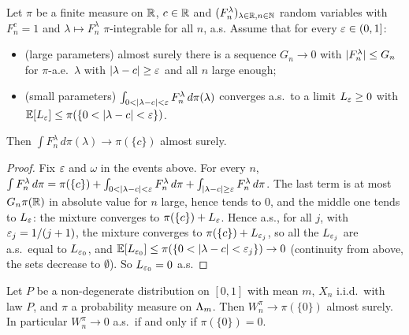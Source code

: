 \begin{lemma}
  \label{lem:nocash_abstract}
  \leanok
  Let $\pi$ be a finite measure on $\mathbb{R}$, $c \in \mathbb{R}$ and $(F^\lambda_n)_{\lambda \in \mathbb{R}, n \in \mathbb{N}}$
  random variables with $F^c_n = 1$ and $\lambda \mapsto F^\lambda_n$ $\pi$-integrable for all $n$,
  a.s. Assume that for every $\varepsilon \in (0, 1]$:
  \begin{itemize}
    \item (large parameters) almost surely there is a sequence $G_n \to 0$ with
      $\lvert F^\lambda_n \rvert \le G_n$ for $\pi$-a.e.\ $\lambda$ with $\lvert \lambda - c \rvert \ge \varepsilon$ and all
      $n$ large enough;
    \item (small parameters) $\int_{0 < \lvert \lambda - c \rvert < \varepsilon} F^\lambda_n \, d\pi(\lambda)$
      converges a.s.\ to a limit $L_\varepsilon \ge 0$ with $\mathbb{E}[L_\varepsilon] \le \pi(\{0 < \lvert \lambda - c \rvert <
      \varepsilon\})$.
  \end{itemize}
  Then $\int F^\lambda_n \, d\pi(\lambda) \to \pi(\{c\})$ almost surely.
\end{lemma}

\begin{proof}
  \leanok
  Fix $\varepsilon$ and $\omega$ in the events above. For every $n$,
  $\int F^\lambda_n \, d\pi = \pi(\{c\}) + \int_{0 < \lvert \lambda - c \rvert < \varepsilon} F^\lambda_n \, d\pi
  + \int_{\lvert \lambda - c \rvert \ge \varepsilon} F^\lambda_n \, d\pi$. The last term is at most $G_n
  \pi(\mathbb{R})$ in absolute value for $n$ large, hence tends to $0$, and the middle one tends to
  $L_\varepsilon$: the mixture converges to $\pi(\{c\}) + L_\varepsilon$. Hence a.s., for all $j$, with $\varepsilon_j =
  1/(j+1)$, the mixture converges to $\pi(\{c\}) + L_{\varepsilon_j}$, so all the $L_{\varepsilon_j}$ are a.s.\
  equal to $L_{\varepsilon_0}$, and $\mathbb{E}[L_{\varepsilon_0}] \le \pi(\{0 < \lvert \lambda - c \rvert < \varepsilon_j\}) \to 0$
  (continuity from above, the sets decrease to $\emptyset$). So $L_{\varepsilon_0} = 0$ a.s.
\end{proof}

\begin{theorem}
  \label{thm:nocash}
  \leanok
  Let $P$ be a non-degenerate distribution on $[0,1]$ with mean $m$, $X_n$ i.i.d.\ with law $P$, and
  $\pi$ a probability measure on $\Lambda_m$. Then $W^\pi_n \to \pi(\{0\})$ almost surely. In particular
  $W^\pi_n \to 0$ a.s.\ if and only if $\pi(\{0\}) = 0$.
\end{theorem}

